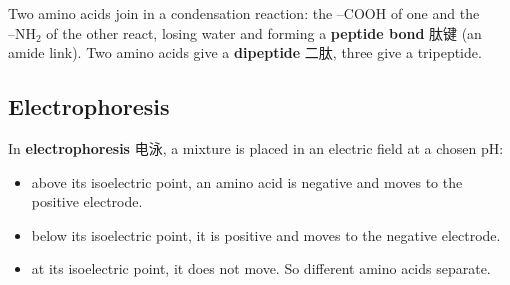 \documentclass[11pt]{article}
\begin{document}
Two amino acids join in a condensation reaction: the $\text{–COOH}$ of one and the $\text{–NH}_2$ of the other react, losing water and forming a \textbf{peptide bond} 肽键 (an amide link). Two amino acids give a \textbf{dipeptide} 二肽, three give a tripeptide.

\subsection*{Electrophoresis}

In \textbf{electrophoresis} 电泳, a mixture is placed in an electric field at a chosen pH:

\begin{itemize}
\item above its isoelectric point, an amino acid is negative and moves to the positive electrode.

\item below its isoelectric point, it is positive and moves to the negative electrode.

\item at its isoelectric point, it does not move. So different amino acids separate.

\end{itemize}
\end{document}
